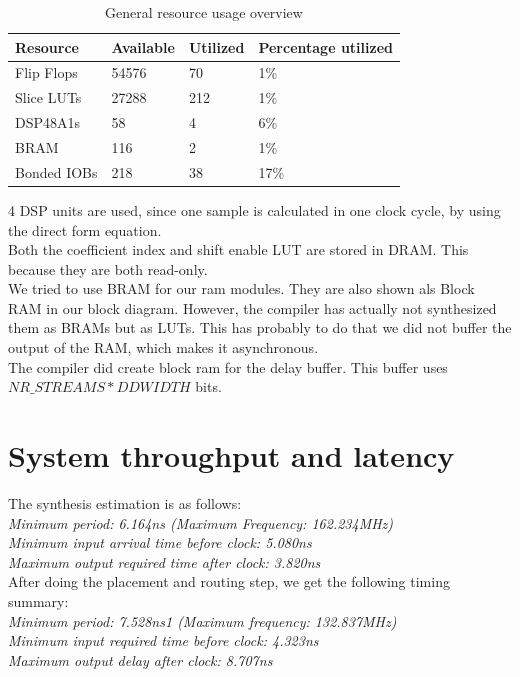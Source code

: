 \documentclass[a4paper,twoside,11pt, fleqn]{article}
\begin{document}
\begin{table}[h]
\begin{tabular}{|l|l|l|l|}
\hline
\textbf{Resource} & \textbf{Available} & \textbf{Utilized} & \textbf{Percentage utilized}\\
\hline
Flip Flops	& 54576 & 70 	& 1\%\\
Slice LUTs 	& 27288 & 212 	& 1\%\\
DSP48A1s	& 58 	& 4 	& 6\%\\
BRAM		& 116 	& 2 	& 1\%\\
Bonded IOBs	& 218 	& 38	& 17\%\\
\hline
\end{tabular}
\caption{General resource usage overview}
\label{tab:3ausage}
\end{table} 

4 DSP units are used, since one sample is calculated in one clock cycle, by using the direct form equation.\\

Both the coefficient index and shift enable LUT are stored in DRAM. This because they are both read-only. \\

We tried to use BRAM for our ram modules. They are also shown als Block RAM in our block diagram. However, the compiler has actually not synthesized them as BRAMs but as LUTs. This has probably to do that we did not buffer the output of the RAM, which makes it asynchronous.\\

The compiler did create block ram for the delay buffer. This buffer uses $NR\_STREAMS * DDWIDTH$ bits.

\newpage
\section{System throughput and latency}
The synthesis estimation is as follows:\\

\textit{Minimum period: 6.164ns (Maximum Frequency: 162.234MHz)\\
Minimum input arrival time before clock: 5.080ns\\
Maximum output required time after clock: 3.820ns}\\

After doing the placement and routing step, we get the following timing summary:\\

\textit{Minimum period:   7.528ns{1}   (Maximum frequency: 132.837MHz)\\
Minimum input required time before clock:   4.323ns\\
Maximum output delay after clock:   8.707ns}\\
\end{document}

